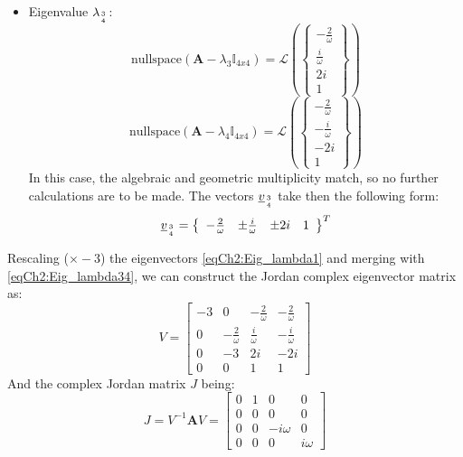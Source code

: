 \begin{itemize}
			\item[\GMVred{$\bullet$}]Eigenvalue $\lambda_{3\atop 4}$: 
			\[
			\text{nullspace}\left(\bm A - \lambda_{3} \mathbb{I}_{4x4}\right) =  \mathcal{L}\left( \left\{ \begin{array}{c} -\frac{2}{\omega} \\ \frac{i}{\omega} \\ 2 i \\ 1 \end{array}\right\} \right)
			\]
			\[
			\text{nullspace}\left(\bm A - \lambda_{4} \mathbb{I}_{4x4}\right) =  \mathcal{L}\left( \left\{ \begin{array}{c} -\frac{2}{\omega} \\ -\frac{i}{\omega} \\ -2 i \\ 1 \end{array}\right\} \right)
			\]
			\indent In this case, the algebraic and geometric multiplicity match, so no further calculations are to be made. The vectors $\underline{v}_{3\atop 4}$ take then the following form:
			\begin{equation}
			\label{eqCh2:Eig_lambda34}
			\underline{v}_{3\atop 4} = \left\{ \begin{array}{cccc} -\frac{2}{\omega} & \pm \frac{i}{\omega} & \pm 2 i  & 1 \end{array}\right\}^T
			\end{equation}
			\end{itemize}
			\indent Rescaling ($\times -3$) the eigenvectors \eqref{eqCh2:Eig_lambda1} and merging with \eqref{eqCh2:Eig_lambda34}, we can construct the Jordan complex eigenvector matrix as:
			\[
			V = \left[ \begin{array}{cccc}
			-3 	& 0					& -\frac{2}{\omega}	& -\frac{2}{\omega}	 	\\
			0 	& -\frac{2}{\omega}	&  \frac{i}{\omega} & -\frac{i}{\omega} 	\\
			0 	& -3				& 2i				& -2i 					\\
			0 	& 0					& 1 				& 1
			\end{array}\right]
			\]
			\indent And the complex Jordan matrix $J$ being:
			\begin{equation}
			J = V^{-1} \bm A V = \left[ \begin{array}{cccc}
			0 	& 1					& 0					& 0		\\
			0 	& 0					& 0 				& 0 	\\
			0 	& 0					& -i\omega			& 0 	\\
			0 	& 0					& 0 				& i\omega
			\end{array}\right]
			\label{eqCh2:Comp_lambda}
			\end{equation}
